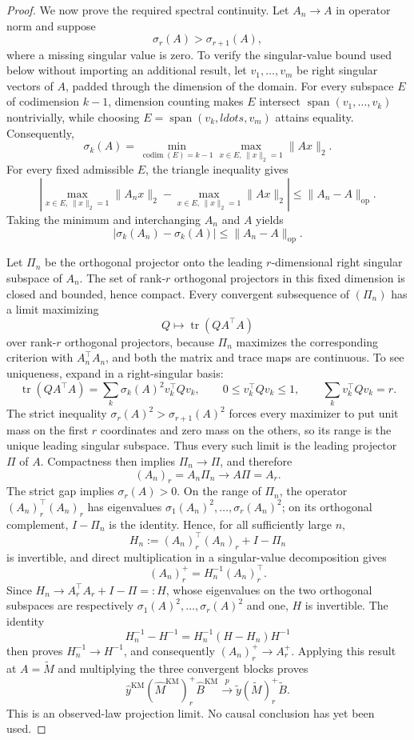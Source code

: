 \documentclass{article}
\begin{document}
\begin{proof}
We now prove the required spectral continuity. Let \(A_n\to A\) in operator norm and suppose
\[
\sigma_r(A)>\sigma_{r+1}(A),
\]
where a missing singular value is zero. To verify the singular-value bound used below without importing an additional result, let \(v_1,\ldots,v_m\) be right singular vectors of \(A\), padded through the dimension of the domain. For every subspace \(E\) of codimension \(k-1\), dimension counting makes \(E\) intersect \(\operatorname{span}(v_1,\ldots,v_k)\) nontrivially, while choosing \(E=\operatorname{span}(v_k,ldots,v_m)\) attains equality. Consequently,
\[
\sigma_k(A)=\min_{\operatorname{codim}(E)=k-1}
 \max_{x\in E,\,\|x\|_2=1}\|Ax\|_2.
\]
For every fixed admissible \(E\), the triangle inequality gives
\[
\left|\max_{x\in E,\,\|x\|_2=1}\|A_nx\|_2-
\max_{x\in E,\,\|x\|_2=1}\|Ax\|_2\right|
\le \|A_n-A\|_{\mathrm{op}}.
\]
Taking the minimum and interchanging \(A_n\) and \(A\) yields
\[
|\sigma_k(A_n)-\sigma_k(A)|\le\|A_n-A\|_{\mathrm{op}}.
\]

Let \(\Pi_n\) be the orthogonal projector onto the leading \(r\)-dimensional right singular subspace of \(A_n\). The set of rank-\(r\) orthogonal projectors in this fixed dimension is closed and bounded, hence compact. Every convergent subsequence of \((\Pi_n)\) has a limit maximizing
\[
Q\longmapsto\operatorname{tr}(QA^\top A)
\]
over rank-\(r\) orthogonal projectors, because \(\Pi_n\) maximizes the corresponding criterion with \(A_n^\top A_n\), and both the matrix and trace maps are continuous. To see uniqueness, expand in a right-singular basis:
\[
\operatorname{tr}(QA^\top A)=\sum_k\sigma_k(A)^2v_k^\top Qv_k,
\qquad 0\le v_k^\top Qv_k\le1,
\qquad \sum_kv_k^\top Qv_k=r.
\]
The strict inequality \(\sigma_r(A)^2>\sigma_{r+1}(A)^2\) forces every maximizer to put unit mass on the first \(r\) coordinates and zero mass on the others, so its range is the unique leading singular subspace. Thus every such limit is the leading projector \(\Pi\) of \(A\). Compactness then implies \(\Pi_n\to\Pi\), and therefore
\[
(A_n)_r=A_n\Pi_n\longrightarrow A\Pi=A_r.
\]
The strict gap implies \(\sigma_r(A)>0\). On the range of \(\Pi_n\), the operator \((A_n)_r^\top(A_n)_r\) has eigenvalues \(\sigma_1(A_n)^2,\ldots,\sigma_r(A_n)^2\); on its orthogonal complement, \(I-\Pi_n\) is the identity. Hence, for all sufficiently large \(n\),
\[
H_n:=(A_n)_r^\top(A_n)_r+I-\Pi_n
\]
is invertible, and direct multiplication in a singular-value decomposition gives
\[
(A_n)_r^+=H_n^{-1}(A_n)_r^\top.
\]
Since \(H_n\to A_r^\top A_r+I-\Pi=:H\), whose eigenvalues on the two orthogonal subspaces are respectively \(\sigma_1(A)^2,\ldots,\sigma_r(A)^2\) and one, \(H\) is invertible. The identity
\[
H_n^{-1}-H^{-1}=H_n^{-1}(H-H_n)H^{-1}
\]
then proves \(H_n^{-1}\to H^{-1}\), and consequently \((A_n)_r^+\to A_r^+\). Applying this result at \(A=\widetilde M\) and multiplying the three convergent blocks proves
\[
\widehat y^{\mathrm{KM}}(\widehat M^{\mathrm{KM}})_r^+
\widehat B^{\mathrm{KM}}
\xrightarrow{p}
\widetilde y(\widetilde M)_r^+\widetilde B.
\]
This is an observed-law projection limit. No causal conclusion has yet been used.


\end{proof}
\end{document}
